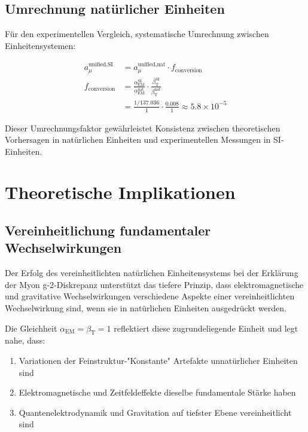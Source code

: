 \documentclass[12pt,a4paper]{article}
\newcommand{\alphaEM}{\alpha_{\text{EM}}}
\newcommand{\betaT}{\beta_{\text{T}}}
\begin{document}
	\subsection{Umrechnung natürlicher Einheiten}
	
	Für den experimentellen Vergleich, systematische Umrechnung zwischen Einheitensystemen:
	
	\begin{align}
		a_\mu^{\text{unified,SI}} &= a_\mu^{\text{unified,nat}} \cdot f_{\text{conversion}} \\
		f_{\text{conversion}} &= \frac{\alphaEM^{\text{SI}}}{\alphaEM^{\text{nat}}} \cdot \frac{\betaT^{\text{SI}}}{\betaT^{\text{nat}}} \\
		&= \frac{1/137.036}{1} \cdot \frac{0.008}{1} \approx 5.8 \times 10^{-5}
	\end{align}
	
	Dieser Umrechnungsfaktor gewährleistet Konsistenz zwischen theoretischen Vorhersagen in natürlichen Einheiten und experimentellen Messungen in SI-Einheiten.
	
	\section{Theoretische Implikationen}
	
	\subsection{Vereinheitlichung fundamentaler Wechselwirkungen}
	\label{subsec:fundamental_unification}
	
	Der Erfolg des vereinheitlichten natürlichen Einheitensystems bei der Erklärung der Myon g-2-Diskrepanz unterstützt das tiefere Prinzip, dass elektromagnetische und gravitative Wechselwirkungen verschiedene Aspekte einer vereinheitlichten Wechselwirkung sind, wenn sie in natürlichen Einheiten ausgedrückt werden.
	
	Die Gleichheit $\alphaEM = \betaT = 1$ reflektiert diese zugrundeliegende Einheit und legt nahe, dass:
	
	\begin{enumerate}
		\item Variationen der Feinstruktur-"Konstante" Artefakte unnatürlicher Einheiten sind
		\item Elektromagnetische und Zeitfeldeffekte dieselbe fundamentale Stärke haben
		\item Quantenelektrodynamik und Gravitation auf tiefster Ebene vereinheitlicht sind
	\end{enumerate}
	
\end{document}
